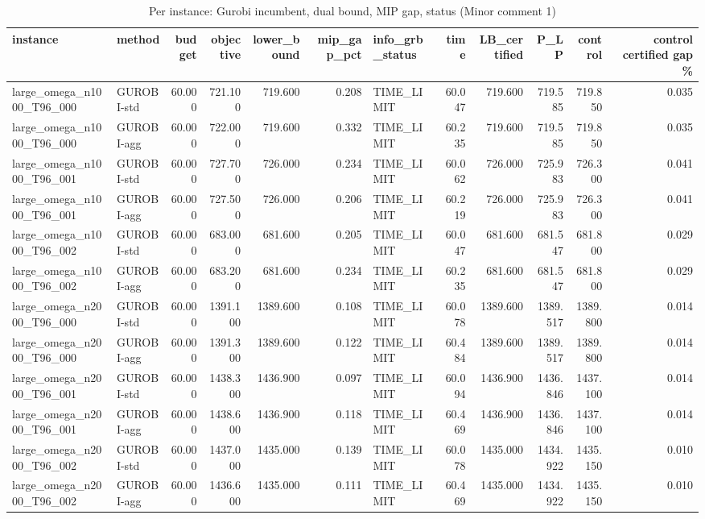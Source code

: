 \begin{table}[htbp]
\centering
\small
\caption{Per instance: Gurobi incumbent, dual bound, MIP gap, status (Minor comment 1)}
\label{tab:E4b_equal_budgets_60s_gurobi_per_instance}
\begin{tabular}{llrrrrlrrrrr}
\toprule
instance & method & budget & objective & lower\_bound & mip\_gap\_pct & info\_grb\_status & time & LB\_certified & P\_LP & control & control certified gap \% \\
\midrule
large\_omega\_n1000\_T96\_000 & GUROBI-std & 60.000 & 721.100 & 719.600 & 0.208 & TIME\_LIMIT & 60.047 & 719.600 & 719.585 & 719.850 & 0.035 \\
large\_omega\_n1000\_T96\_000 & GUROBI-agg & 60.000 & 722.000 & 719.600 & 0.332 & TIME\_LIMIT & 60.235 & 719.600 & 719.585 & 719.850 & 0.035 \\
large\_omega\_n1000\_T96\_001 & GUROBI-std & 60.000 & 727.700 & 726.000 & 0.234 & TIME\_LIMIT & 60.062 & 726.000 & 725.983 & 726.300 & 0.041 \\
large\_omega\_n1000\_T96\_001 & GUROBI-agg & 60.000 & 727.500 & 726.000 & 0.206 & TIME\_LIMIT & 60.219 & 726.000 & 725.983 & 726.300 & 0.041 \\
large\_omega\_n1000\_T96\_002 & GUROBI-std & 60.000 & 683.000 & 681.600 & 0.205 & TIME\_LIMIT & 60.047 & 681.600 & 681.547 & 681.800 & 0.029 \\
large\_omega\_n1000\_T96\_002 & GUROBI-agg & 60.000 & 683.200 & 681.600 & 0.234 & TIME\_LIMIT & 60.235 & 681.600 & 681.547 & 681.800 & 0.029 \\
large\_omega\_n2000\_T96\_000 & GUROBI-std & 60.000 & 1391.100 & 1389.600 & 0.108 & TIME\_LIMIT & 60.078 & 1389.600 & 1389.517 & 1389.800 & 0.014 \\
large\_omega\_n2000\_T96\_000 & GUROBI-agg & 60.000 & 1391.300 & 1389.600 & 0.122 & TIME\_LIMIT & 60.484 & 1389.600 & 1389.517 & 1389.800 & 0.014 \\
large\_omega\_n2000\_T96\_001 & GUROBI-std & 60.000 & 1438.300 & 1436.900 & 0.097 & TIME\_LIMIT & 60.094 & 1436.900 & 1436.846 & 1437.100 & 0.014 \\
large\_omega\_n2000\_T96\_001 & GUROBI-agg & 60.000 & 1438.600 & 1436.900 & 0.118 & TIME\_LIMIT & 60.469 & 1436.900 & 1436.846 & 1437.100 & 0.014 \\
large\_omega\_n2000\_T96\_002 & GUROBI-std & 60.000 & 1437.000 & 1435.000 & 0.139 & TIME\_LIMIT & 60.078 & 1435.000 & 1434.922 & 1435.150 & 0.010 \\
large\_omega\_n2000\_T96\_002 & GUROBI-agg & 60.000 & 1436.600 & 1435.000 & 0.111 & TIME\_LIMIT & 60.469 & 1435.000 & 1434.922 & 1435.150 & 0.010 \\

\end{tabular}
\end{table}

